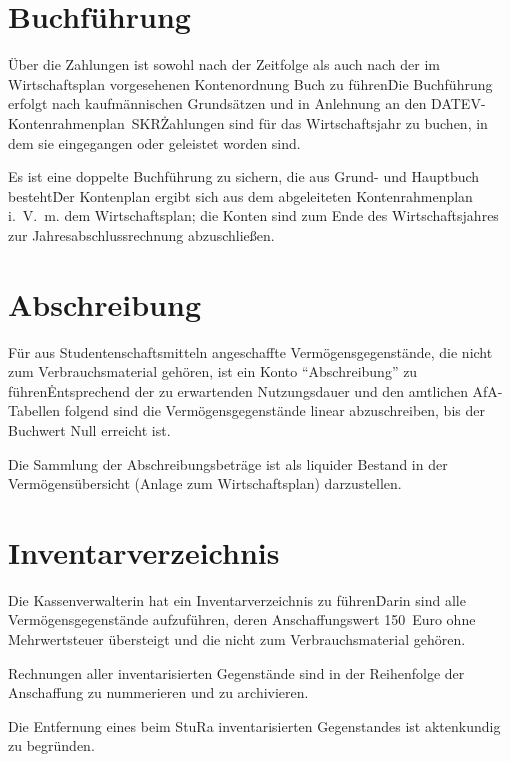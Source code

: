 \begin{multicols}{2}
\section{Buchführung}

\Abs \Satz Über die Zahlungen ist sowohl nach der Zeitfolge als auch nach der im Wirtschaftsplan vorgesehenen Kontenordnung Buch zu führen\. Die Buchführung erfolgt nach kaufmännischen Grundsätzen und in Anlehnung an den DATEV-Kontenrahmenplan~SKR\. Zahlungen sind für das Wirtschaftsjahr zu buchen, in dem sie eingegangen oder geleistet worden sind.

\Abs \Satz Es ist eine doppelte Buchführung zu sichern, die aus Grund- und Hauptbuch besteht\. Der Kontenplan ergibt sich aus dem abgeleiteten Kontenrahmenplan i.~V.~m. dem Wirtschaftsplan; die Konten sind zum Ende des Wirtschaftsjahres zur Jahresabschlussrechnung abzuschließen.



\section{Abschreibung}

\Abs \Satz Für aus Studentenschaftsmitteln angeschaffte Vermögensgegenstände, die nicht zum Verbrauchsmaterial gehören, ist ein Konto "`Abschreibung"' zu führen\. Entsprechend der zu erwartenden Nutzungsdauer und den amtlichen AfA-Tabellen folgend sind die Vermögensgegenstände linear abzuschreiben, bis der Buchwert Null erreicht ist.

\Abs \Satz Die Sammlung der Abschreibungsbeträge ist als liquider Bestand in der Vermögensübersicht (Anlage zum Wirtschaftsplan) darzustellen.



\section{Inventarverzeichnis}

\Abs \Satz Die Kassenverwalterin hat ein Inventarverzeichnis zu führen\. Darin sind alle Vermögensgegenstände aufzuführen, deren Anschaffungswert 150~Euro ohne Mehrwertsteuer übersteigt und die nicht zum Verbrauchsmaterial gehören.

\Abs \Satz Rechnungen aller inventarisierten Gegenstände sind in der Reihenfolge der Anschaffung zu nummerieren und zu archivieren.

\Abs \Satz Die Entfernung eines beim StuRa inventarisierten Gegenstandes ist aktenkundig zu begründen.


\end{multicols}
